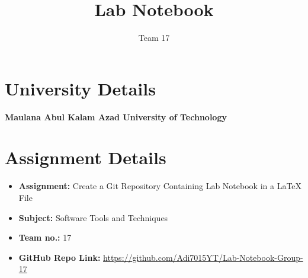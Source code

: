 \documentclass[a4paper,12pt]{article}
\title{Lab Notebook}
\author{Team 17}
\date{}
\begin{document}
\maketitle

\section*{University Details}
\textbf{Maulana Abul Kalam Azad University of Technology}

\section*{Assignment Details}
\begin{itemize}
    \item \textbf{Assignment:} Create a Git Repository Containing Lab Notebook in a LaTeX File
    \item \textbf{Subject:} Software Tools and Techniques
    \item \textbf{Team no.:} 17
    \item \textbf{GitHub Repo Link:} \url{https://github.com/Adi7015YT/Lab-Notebook-Group-17}
\end{itemize}
\end{document}
